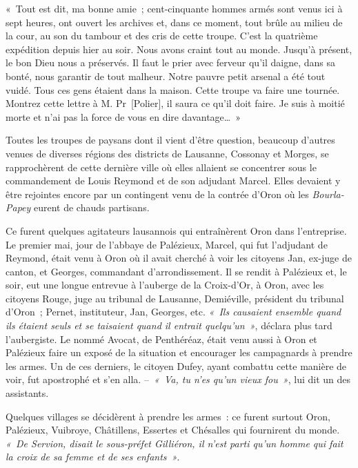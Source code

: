 \documentclass[french,twoside]{book} %
\newenvironment{quoteblock}%
  {\begin{quoting}}
  {\end{quoting}}
\newenvironment{quotebar}{%
    \def\FrameCommand{{\color{rubric!10!}\vrule width 0.5em} \hspace{0.9em}}%
    \def\OuterFrameSep{\itemsep} %
    \MakeFramed {\advance\hsize-\width \FrameRestore}
  }%
  {%
    \endMakeFramed
  }
\renewenvironment{quoteblock}%
  {%
    \savenotes
    \setstretch{0.9}
    \normalfont
    \begin{quotebar}
  }
  {%
    \end{quotebar}
    \spewnotes
  }
\begin{document}
\begin{quoteblock}
 \noindent « Tout est dit, ma bonne amie ; cent-cinquante hommes armés sont venus ici à sept heures, ont ouvert les archives et, dans ce moment, tout brûle au milieu de la cour, au son du tambour et des cris de cette troupe. C’est la quatrième expédition depuis hier au soir. Nous avons craint tout au monde. Jusqu’à présent, le bon Dieu nous a préservés. Il faut le prier avec ferveur qu’il daigne, dans sa bonté, nous garantir de tout malheur. Notre pauvre petit arsenal a été tout vuidé. Tous ces gens étaient dans la maison. Cette troupe va faire une tournée. Montrez cette lettre à M. Pr [Polier], il saura ce qu’il doit faire. Je suis à moitié morte et n’ai pas la force de vous en dire davantage… »
 \end{quoteblock}

\noindent Toutes les troupes de paysans dont il vient d’être question, beaucoup d’autres venues de diverses régions des districts de Lausanne, Cossonay et Morges, se rapprochèrent de cette dernière ville où elles allaient se concentrer sous le commandement de Louis Reymond et de son adjudant Marcel. Elles devaient y être rejointes encore par un contingent venu de la contrée d’Oron où les \emph{Bourla-Papey} eurent de chauds partisans.\par
Ce furent quelques agitateurs lausannois qui entraînèrent Oron dans l’entreprise. Le premier mai, jour de l’abbaye de Palézieux, Marcel, qui fut l’adjudant de Reymond, était venu à Oron où il avait cherché à voir les citoyens Jan, ex-juge de canton, et Georges, commandant d’arrondissement. Il se rendit à Palézieux et, le soir, eut une longue entrevue à l’auberge de la Croix-d’Or, à Oron, avec les citoyens Rouge, juge au tribunal de Lausanne, Demiéville, président du tribunal d’Oron ; Pernet, instituteur, Jan, Georges, etc. \emph{« Ils causaient ensemble quand ils étaient seuls et se taisaient quand il entrait quelqu’un »}, déclara plus tard l’aubergiste. Le nommé Avocat, de Penthéréaz, était venu aussi à Oron et Palézieux faire un exposé de la situation et encourager les campagnards à prendre les armes. Un de ces derniers, le citoyen Dufey, ayant combattu cette manière de voir, fut apostrophé et s’en alla. – \emph{« Va, tu n’es qu’un vieux fou »}, lui dit un des assistants.\par
Quelques villages se décidèrent à prendre les armes : ce furent surtout Oron, Palézieux, Vuibroye, Châtillens, Essertes et Chésalles qui fournirent du monde. \emph{« De Servion, disait le sous-préfet Gilliéron, il n’est parti qu’un homme qui fait la croix de sa femme et de ses enfants »}.\par
\end{document}
